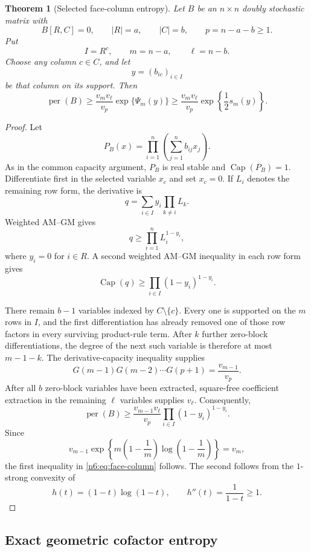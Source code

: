 \documentclass[11pt]{article}
\numberwithin{equation}{section}
\newtheorem{theorem}{Theorem}[section]
\theoremstyle{definition}
\newcommand{\per}{\operatorname{per}}
\newcommand{\pcap}{\operatorname{Cap}}
\begin{document}
\begin{theorem}[Selected face-column entropy]\label{n6:thm:face-column}
Let $B$ be an $n\times n$ doubly stochastic matrix with
\[
 B[R,C]=0,
 \qquad |R|=a,
 \qquad |C|=b,
 \qquad p=n-a-b\ge1.
\]
Put
\[
 I=R^c,
 \qquad m=n-a,
 \qquad \ell=n-b.
\]
Choose any column $c\in C$, and let
\[
 y=(b_{ic})_{i\in I}
\]
be that column on its support.  Then
\begin{equation}
 \per(B)
 \ge
 \frac{v_m v_\ell}{v_p}\exp\{\Psi_m(y)\}
 \ge
 \frac{v_m v_\ell}{v_p}
 \exp\left\{\frac12s_m(y)\right\}.\label{n6:eq:face-column}
\end{equation}
\end{theorem}

\begin{proof}
Let
\[
 P_B(x)=\prod_{i=1}^n\left(\sum_{j=1}^n b_{ij}x_j\right).
\]
As in the common capacity argument, $P_B$ is real stable and
$\pcap(P_B)=1$.  Differentiate first in the selected variable $x_c$ and set
$x_c=0$.  If $L_i$ denotes the remaining row form, the derivative is
\[
 q=\sum_{i\in I}y_i\prod_{k\ne i}L_k.
\]
Weighted AM--GM gives
\[
 q\ge\prod_{i=1}^nL_i^{1-y_i},
\]
where $y_i=0$ for $i\in R$.  A second weighted AM--GM inequality in each row
form gives
\[
 \pcap(q)\ge\prod_{i\in I}(1-y_i)^{1-y_i}.\label{n6:eq:q-capacity}
\]

There remain $b-1$ variables indexed by $C\setminus\{c\}$.  Every one is
supported on the $m$ rows in $I$, and the first differentiation has already
removed one of those row factors in every surviving product-rule term.  After
$k$ further zero-block differentiations, the degree of the next such variable
is therefore at most $m-1-k$.  The derivative-capacity inequality supplies
\[
 G(m-1)G(m-2)\cdots G(p+1)=\frac{v_{m-1}}{v_p}.
\]
After all $b$ zero-block variables have been extracted, square-free
coefficient extraction in the remaining $\ell$ variables supplies $v_\ell$.
Consequently,
\[
 \per(B)
 \ge
 \frac{v_{m-1}v_\ell}{v_p}
 \prod_{i\in I}(1-y_i)^{1-y_i}.
\]
Since
\[
 v_{m-1}
 \exp\left\{m\left(1-\frac1m\right)
                   \log\left(1-\frac1m\right)\right\}
 =v_m,
\]
the first inequality in \eqref{n6:eq:face-column} follows.  The second follows
from the $1$-strong convexity of
\[
 h(t)=(1-t)\log(1-t),
 \qquad h''(t)=\frac1{1-t}\ge1.
\]
\end{proof}

\subsection{Exact geometric cofactor entropy}
\end{document}
